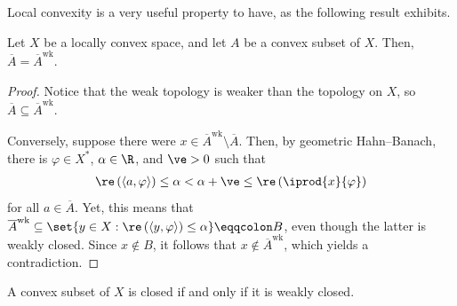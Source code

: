 \documentclass[10pt]{mypackage}
\renewcommand{\eqcolon}{\eqqcolon}
\begin{document}
Local convexity is a very useful property to have, as the following result exhibits.
\begin{theorem}
  Let $X$ be a locally convex space, and let $A$ be a convex subset of $X$. Then, $ \overline{A} = \overline{A}^{\operatorname{wk}} $.
\end{theorem}
\begin{proof}
  Notice that the weak topology is weaker than the topology on $X$, so $ \overline{A}\subseteq \overline{A}^{\operatorname{wk}} $.

  Conversely, suppose there were $x\in \overline{A}^{\operatorname{wk}}\setminus \overline{A}$. Then, by geometric Hahn--Banach, there is $\varphi\in X^{\ast}$, $\alpha\in \R$, and $\ve > 0$ such that
  \begin{align*}
    \re\left( \left\langle a,\varphi \right\rangle \right) \leq \alpha < \alpha + \ve \leq \re\left( \iprod{x}{\varphi} \right)
  \end{align*}
  for all $a\in \overline{A}$. Yet, this means that $ \overline{A}^{\operatorname{wk}}\subseteq \set{y\in X : \re\left( \left\langle y,\varphi \right\rangle \right)\leq \alpha} \eqcolon B$, even though the latter is weakly closed. Since $x\notin B$, it follows that $x\notin \overline{A}^{\operatorname{wk}}$, which yields a contradiction.
\end{proof}
\begin{corollary}
  A convex subset of $X$ is closed if and only if it is weakly closed.
\end{corollary}
\end{document}

